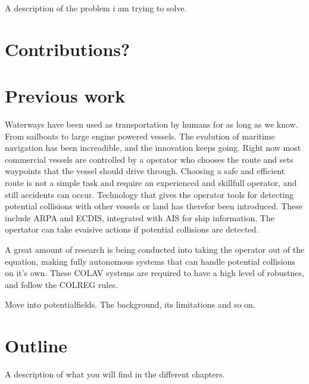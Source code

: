 A description of the problem i am trying to solve. 

\section{Contributions?}

\section{Previous work}
Waterways have been used as transportation by humans for as long as we know. From sailboats to large engine powered vessels.
The evolution of maritime navigation has been increadible, and the innovation keeps going. Right now most commercial vessels are controlled by a operator who
chooses the route and sets waypoints that the vessel should drive through. Choosing a safe and efficient route is not a simple task and require an experienced and skillfull operator,
and still accidents can occur. Technology that gives the operator tools for detecting potential collisions with other vessels or land has therefor been introduced.
These include ARPA and ECDIS, integrated with AIS for ship information. The opertator can take evaisive actions if potential collisions are detected. 


A great amount of research is being conducted into taking the operator out of the equation, making fully autonomous systems that can handle potential collisions
on it's own. These COLAV systems are required to have a high level of robustnes, and follow the COLREG rules. 

Move into potentialfields. The background, its limitations and so on. 

\section{Outline}
A description of what you will find in the different chapters. 

\cleardoublepage